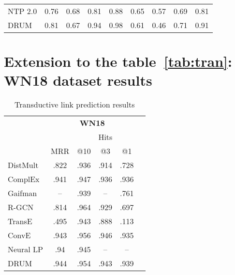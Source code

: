 \documentclass{article}
\begin{document}
\begin{table}[!h]
\begin{tabular}{lrrrrrrrr}
NTP 2.0                                       & 0.76                    & 0.68                       & 0.81                       & 0.88                        & 0.65                    & 0.57                       & 0.69                       & 0.81                         \\
DRUM                                          & 0.81                    & 0.67                       & 0.94                       & 0.98                        & 0.61                    & 0.46                       & 0.71                       & 0.91                         \\
\bottomrule
\end{tabular}
\end{table}

\clearpage

\section{Extension to the table~\ref{tab:tran}: WN18 dataset results}
\begin{table}[!h]
    \centering  
    \caption{Transductive link prediction results}
    \label{tab:tran_appendix}
    \begin{tabular}{lccccc}
        \toprule
         & \multicolumn{4}{c}{\textbf{WN18}} 
        \\
        \cmidrule{2-5} 
         & & \multicolumn{3}{c}{Hits}
        \\
        \cmidrule{3-5} 
         & MRR & @10 & @3 & @1 
        \\
        \midrule
        DistMult  & .822 & .936 & .914 & .728 
        \\
        ComplEx  & .941 & .947 & .936 & .936 
        \\
        Gaifman  & --    & .939 &  --   & .761   
        \\
        R-GCN  & .814 & .964 & .929 & .697 
        \\
        TransE & .495 & .943 & .888 & .113 
        \\
ConvE  & .943 & .956 & .946 &.935 \\
        \midrule
        
        Neural LP  & .94 & .945 & -- & -- 
        \\
        DRUM & .944 & .954 & .943 & .939  \\ 
        \bottomrule
    \end{tabular}
\end{table}
\end{document}
